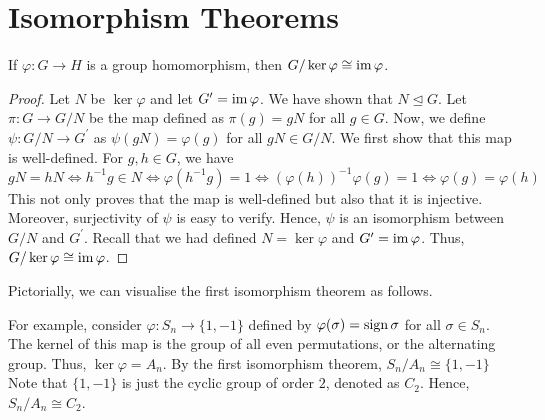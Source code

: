 \newpage
\section{Isomorphism Theorems}

\begin{theorem} \label{thm:iso1}
    If $\varphi \colon G \to H$ is a group homomorphism, then $G/\ker\varphi \cong \operatorname{im}\varphi$.
\end{theorem}
\begin{proof}
    Let $N$ be $\ker\varphi$ and let $G^{\prime} = \operatorname{im}\varphi$. We have shown that $N \trianglelefteq G$. Let $\pi \colon G \to G/N$ be the map defined as $\pi(g) = gN$ for all $g \in G$. Now, we define $\psi \colon G/N \to G^{\prime}$ as $\psi(gN) = \varphi(g)$ for all $gN \in G/N$. We first show that this map is well-defined. For $g,h \in G$, we have
    \[
        gN = hN \iff h^{-1}g \in N \iff \varphi(h^{-1}g) = 1 \iff (\varphi(h))^{-1} \varphi(g) = 1 \iff \varphi(g) = \varphi(h)
    \]
    This not only proves that the map is well-defined but also that it is injective. Moreover, surjectivity of $\psi$ is easy to verify. Hence, $\psi$ is an isomorphism between $G/N$ and $G^{\prime}$. Recall that we had defined $N = \ker\varphi$ and $G^{\prime} = \operatorname{im}\varphi$. Thus, $G/\ker\varphi \cong \operatorname{im}\varphi$.
\end{proof}

Pictorially, we can visualise the first isomorphism theorem as follows.

\begin{center}
\end{center}

For example, consider $\varphi \colon S_n \to \{1,-1\}$ defined by $\varphi(\sigma) = \operatorname{sign}\sigma$ for all $\sigma \in S_n$. The kernel of this map is the group of all even permutations, or the alternating group. Thus, $\ker\varphi = A_n$. By the first isomorphism theorem, $S_n/A_n \cong \{1,-1\}$ Note that $\{1,-1\}$ is just the cyclic group of order $2$, denoted as $C_2$. Hence, $S_n/A_n \cong C_2$.

\medskip

